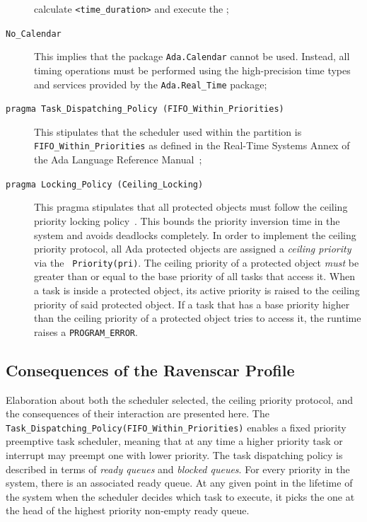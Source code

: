 \begin{description}
{  calculate \texttt{<time\_duration>} and execute the ;}
\item[\texttt{No\_Calendar}]{This implies that the package
  \texttt{Ada.Calendar} cannot be used. Instead, all timing operations
  must be performed using the high-precision time types and services
  provided by the \texttt{Ada.Real\_Time} package;}
\item[\texttt{pragma Task\_Dispatching\_Policy
    (FIFO\_Within\_Priorities)}]{This stipulates that the scheduler
  used within the partition is \texttt{FIFO\_Within\_Priorities} as
  defined in the Real-Time Systems Annex of the Ada Language Reference
  Manual~\cite{arm95, arm05};}
\item[\texttt{pragma Locking\_Policy (Ceiling\_Locking)}]{This pragma
  stipulates that all protected objects must follow the ceiling
  priority locking policy~\cite{sha@toc90}. This bounds the priority
  inversion time in the system and avoids deadlocks completely. In
  order to implement the ceiling priority protocol, all Ada protected
  objects are assigned a \emph{ceiling priority} via the
  \texttt{ Priority(pri)}. The ceiling priority of a
  protected object \emph{must} be greater than or equal to the base
  priority of all tasks that access it. When a task is inside a
  protected object, its active priority is raised to the ceiling
  priority of said protected object. If a task that has a base
  priority higher than the ceiling priority of a protected object
  tries to access it, the runtime raises a \texttt{PROGRAM\_ERROR}.}
\end{description}

\subsection{Consequences of the Ravenscar Profile}
Elaboration about both the scheduler selected, the ceiling priority
protocol, and the consequences of their interaction are presented
here. The 
\texttt{Task\_Dispatching\_Policy(FIFO\_Within\_Priorities)} enables a
fixed priority preemptive task scheduler, meaning that at any time a
higher priority task or interrupt may preempt one with lower
priority. The task dispatching policy is described in terms of
\emph{ready queues} and \emph{blocked queues}. For every priority in
the system, there is an associated ready queue. At any given point in
the lifetime of the system when the scheduler decides which task to
execute, it picks the one at the head of the highest priority
non-empty ready queue.

